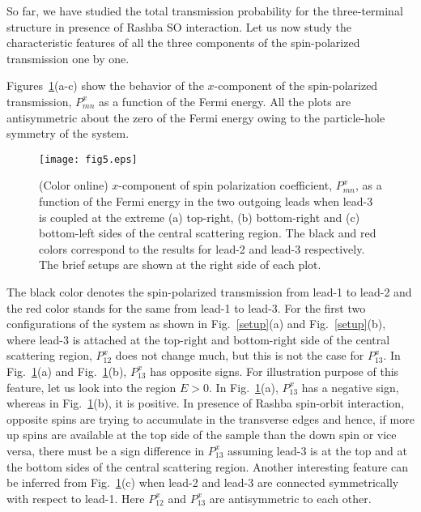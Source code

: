 \documentclass[prb,aps,twocolumn,amsmath,amssymb,floatfix,
superscriptaddress]{revtex4}
\begin{document}
So far, we have studied the total transmission probability for the
three-terminal structure in presence of Rashba SO interaction. Let us
now study the characteristic features of all the three components of
the spin-polarized transmission one by one.

Figures~\ref{asym-px}(a-c) show the behavior of the $x$-component of
the spin-polarized transmission, $P^x_{mn}$ as a function of the Fermi
energy. All the plots are antisymmetric about the zero of the Fermi
energy owing to the particle-hole symmetry of the system.
\begin{figure}[h]
\centering
\texttt{[image: fig5.eps]}
\caption{(Color online) $x$-component of spin polarization
  coefficient, $P^x_{mn}$, as a function of the Fermi energy in the
  two outgoing leads when lead-3 is coupled at the extreme (a) top-right, (b) bottom-right and (c) bottom-left
  sides of the central scattering region. The black and red colors
  correspond to the results for lead-2 and lead-3 respectively. The
  brief setups are shown at the right side of each plot.}
\label{asym-px}
\end{figure}
The black color denotes the spin-polarized transmission from lead-1 to
lead-2 and the red color stands for the same from lead-1 to
lead-3. For the first two configurations of the system as shown in
Fig.~\ref{setup}(a) and Fig.~\ref{setup}(b), where lead-3 is attached
at the top-right and bottom-right side of the central scattering
region, $P^x_{12}$ does not change much, but this is not the case for
$P^x_{13}$. In Fig.~\ref{asym-px}(a) and Fig.~\ref{asym-px}(b),
$P^x_{13}$ has opposite signs. For illustration purpose of this
feature, let us look into the region $E>0$. In Fig.~\ref{asym-px}(a),
$P^x_{13}$ has a negative sign, whereas in Fig.~\ref{asym-px}(b), it
is positive. In presence of Rashba spin-orbit interaction, opposite
spins are trying to accumulate in the transverse edges and hence, if
more up spins are available at the top side of the sample than the
down spin or vice versa, there must be a sign difference in $P^x_{13}$
assuming lead-3 is at the top and at the bottom sides of the central
scattering region. Another interesting feature can be inferred from
Fig.~\ref{asym-px}(c) when lead-2 and lead-3 are connected
symmetrically with respect to lead-1. Here $P^x_{12}$ and $P^x_{13}$
are antisymmetric to each other.
\end{document}
